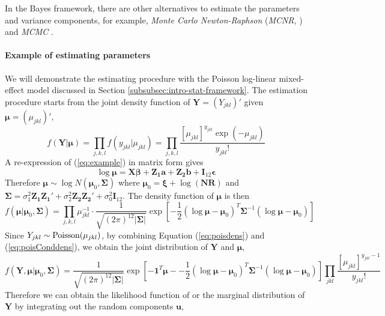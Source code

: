 In the Bayes framework, there are other alternatives to estimate the parameters and variance
components, for example,  \textit{Monte Carlo Newton-Raphson} (\textit{MCNR},
\citealt{mcculloch1997maximum}) and \textit{MCMC} \citep{hadfield2010mcmc}.

\paragraph{Example of estimating parameters}
We will demonstrate the estimating procedure with the Poisson log-linear mixed-effect model
discussed in Section \ref{subsubsec:intro-stat-framework}.
The estimation procedure starts from the joint density function of $\bm Y=(Y_{jkl})'$ given $\bm
\mu= (\mu_{jkl})'$,
\begin{equation}\label{eq:poisdens}
f(\bm Y|\bm \mu )=\prod_{ j,
	k,l}f(y_{jkl}|\mu_{jkl})=\prod_{j,k,l}\frac{[\mu_{jkl}]^{y_{jkl}}\exp(-\mu_{jkl})}{y_{jkl}!}
\end{equation}
A re-expression of  (\ref{eq:example}) in matrix form gives 
\[\log\bm \mu= \bm {X\beta} + \bm {Z_1 a} + \bm{Z_2b} + \bm I_{12}\bm \epsilon \]
Therefore  $\bm\mu  \sim \log N(\bm \mu_0, \bm \Sigma)$ where $\bm \mu_0 =\bm\xi + \log(\bm {NR})$
and $\bm \Sigma = \sigma_1^2\bm {Z_1Z_1'} + \sigma_2^2\bm {Z_2 Z_2'} +\sigma_0^2 \bm I_{12}$.
The density function of $\bm \mu$ is then
\begin{equation}\label{eq:poisConddens}
f(\bm \mu |\bm \mu_0, \bm \Sigma)=\prod_{j,k,l} \mu_{jkl}^{-1}\cdot \frac{1}{
	\sqrt{(2\pi)^{12}|\bm\Sigma|}}\exp[-\frac{1}{2} {(\log\bm \mu - \bm \mu_0)^T\bm \Sigma^{-1}(\log\bm
	\mu - \bm \mu_0)}]
\end{equation}
Since $Y_{jkl}\sim \text{Poisson} (\mu_{jkl})$, by combining Equation (\ref{eq:poisdens}) and
(\ref{eq:poisConddens}), we obtain the joint distribution of $\bm Y$ and $\bm \mu$,
\[f(\bm Y, \bm \mu |\bm \mu_0, \bm \Sigma) =\frac{1}{\sqrt{(2\pi)^{12}|\bm \Sigma|}}\exp[-\bm
1^T\bm \mu - -\frac{1}{2} {(\log\bm \mu - \bm \mu_0)^T\bm \Sigma^{-1}(\log\bm \mu - \bm
	\mu_0)}]\prod_{jkl}\frac{[\mu_{jkl}]^{y_{jkl}-1}}{y_{jkl}!}\]
Therefore we can obtain the likelihood function of or the marginal distribution of $\bm Y$ by
integrating out the random components $\bm u$,
